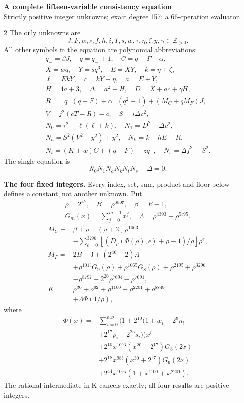 \documentclass[10pt]{article}
\newcommand{\fl}[1]{\left\lfloor#1\right\rfloor}
\begin{document}
\begin{center}
{\large\bfseries A complete fifteen-variable consistency equation}\\[-1pt]
{\small Strictly positive integer unknowns; exact degree 157; a 66-operation evaluator.}
\end{center}\vspace{-8pt}
\begin{multicols}{2}
\fontsize{9}{9.5}\selectfont
The only unknowns are
\[
J,F,\alpha,z,f,h,i,T,s,w,\tau,\eta,\zeta,y,\gamma\in\mathbb Z_{>0}.
\]
All other symbols in the equation are polynomial abbreviations:
\[
\begin{gathered}
q_-=\beta J,\quad q=q_-+1,\quad C=q-F-\alpha,\\
X=wq,\quad Y=sq^3,\quad E=XY,\quad k=\eta+\zeta,\\
\ell=EkY,\quad c=kY+\eta,\quad a=E+Y,\\
H=4a+3,\quad\Delta=a^2+H,\quad D=X+ac+\gamma H,\\
R=[q_-(q-F)+\alpha](q^2-1)+(M_C+qM_F)J,\\
V=f^2(cT-R)-c,\quad S=i\Delta c^2,\\
N_0=\tau^2-\ell(\ell+k),\quad N_1=D^2-\Delta c^2,\\
N_a=S^2(V^2-y^2)+y^2,\quad N_k=k-hE-R,\\
N_t=(K+w)C+(q-F)-zq_-,\quad N_s=\Delta f^2-S^2.
\end{gathered}
\]
The single equation is
\[
\boxed{N_0N_1N_aN_kN_tN_s-\Delta=0.}
\]

\textbf{The four fixed integers.}
Every index, set, sum, product and floor below defines a constant, not
another unknown. Put
\[
\begin{gathered}
\rho=2^{47},\quad B=\rho^{8807},\quad\beta=B-1,\\
G_m(x)=\sum_{j=0}^{m-1}x^j,\quad
\Lambda=\rho^{4393}+\rho^{5495}.
\end{gathered}
\]
\begin{align*}
M_C={}&\beta+\rho-(\rho+3)\rho^{1063}\\
&-\sum_{e=0}^{3296}\fl{(D_\rho(\Phi(\rho),e)+\rho-1)/\rho}\rho^e,\\
M_F={}&2B+3+(2^{46}-2)\Lambda\\
&+\rho^{1013}G_9(\rho)+\rho^{1065}G_8(\rho)
  +\rho^{2195}+\rho^{3296}\\
&-\rho^{8792}+2^{26}\rho^{7694}-\rho^{7691},\\
K={}&\rho^{30}+\rho^{62}+\rho^{1100}+\rho^{2201}+\rho^{8849}\\
&+\Lambda\Phi(1/\rho),
\end{align*}
where
\[
\begin{split}
\Phi(x)={}&\sum_{i=0}^{942}(1+2^{10}(1+w_i+2^8n_i\\
&+2^{17}p_i+2^{25}s_i))x^i\\
&+2^{10}x^{1003}(x^{20}+2^{17})G_8(2x)\\
&+2^{18}x^{983}(x^{30}+2^{17})G_9(2x)\\
&+2^{44}x^{1095}(1+x^{1100}+x^{2201}).
\end{split}
\]
The rational intermediate in K cancels exactly; all four results are positive integers.


\end{multicols}
\end{document}
